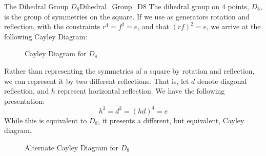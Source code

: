         \begin{lexample}{The Dihedral Group $D_{8}$}{Dihedral_Group_D8}
            The dihedral group on $4$ points, $D_{8}$, is the group of
            symmetries on the square. If we use as generators rotation and
            reflection, with the constraints $r^{4}=f^{2}=e$, and that
            $(rf)^{2}=e$, we arrive at the following Cayley Diagram:
            \begin{figure}[H]
                \centering
                \captionsetup{type=figure}
                
                \caption{Cayley Diagram for $D_{8}$}
                \label{fig:Cayley_Diagram_D8}
            \end{figure}
            Rather than representing the symmetries of a square by rotation and
            reflection, we can represent it by two different reflections. That
            is, let $d$ denote diagonal reflection, and $h$ represent horizontal
            reflection. We have the following presentation:
            \begin{equation}
                h^{2}=d^{2}=(hd)^{4}=e
            \end{equation}
            While this is equivalent to $D_{8}$, it presents a different, but
            equivalent, Cayley diagram.
            \begin{figure}[H]
                \centering
                \captionsetup{type=figure}
                
                \caption{Alternate Cayley Diagram for $D_{8}$}
                \label{fig:Alt_Cayley_Diagram_D8}
            \end{figure}
        \end{lexample}